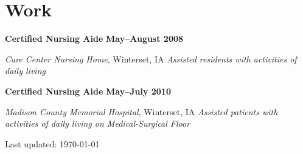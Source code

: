 \documentclass[10pt,letterpaper]{article}
\renewenvironment{itemize}{
  \begin{list}{}{
      \setlength{\leftmargin}{1.5em}
      \setlength{\itemsep}{0.25em}
      \setlength{\parskip}{0pt}
      \setlength{\parsep}{0.25em}
    }
  }{
  \end{list}
}
\newcommand{\yearrange}[1]{\hfill \textbf{#1} \par}
\begin{document}
\section*{Work}

\begin{itemize}
\item \textbf{Certified Nursing Aide} \yearrange{May--August 2008}
  \textit{Care Center Nursing Home}, Winterset, IA
  \textit{Assisted residents with activities of daily living}
\item \textbf{Certified Nursing Aide} \yearrange{May--July 2010}
  \textit{Madison County Memorial Hospital}, Winterset, IA
  \textit{Assisted patients with activities of daily living on Medical-Surgical Floor}
\end{itemize}

\medskip

\begin{center}
  \begin{small}
    Last updated: \today
  \end{small}
\end{center}
\end{document}
